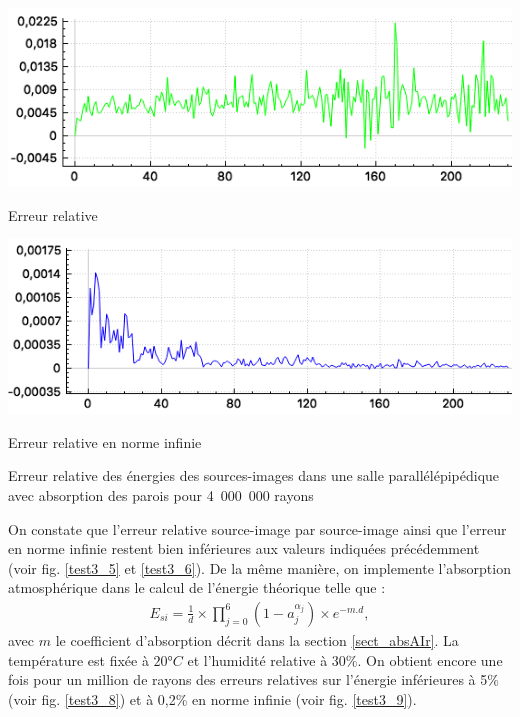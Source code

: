 \begin{figureth}
	\begin{subfigureth}{0.8\textwidth}
		\includegraphics[width=\linewidth]{images/test3_5}
		\caption{Erreur relative}
		\label{test3_5}
	\end{subfigureth}
	\begin{subfigureth}{0.8\textwidth}
		\includegraphics[width=\linewidth]{images/test3_6}
		\caption{Erreur relative en norme infinie}
		\label{test3_6}
	\end{subfigureth}
	\caption{Erreur relative des énergies des sources-images dans une salle parallélépipédique avec absorption des parois pour 4~000~000 rayons}
\end{figureth}


On constate que l'erreur relative source-image par source-image ainsi que l'erreur en norme infinie restent bien inférieures aux valeurs indiquées précédemment (voir fig. \ref{test3_5} et \ref{test3_6}). De la même manière, on implemente l'absorption atmosphérique dans le calcul de l'énergie théorique telle que :
\begin{align}
E_{si} = \frac{1}{d} \times \prod_{j=0}^{6}{(1-a_j^{\alpha_j})} \times e^{-m.d}, 
\end{align}
avec $m$ le coefficient d'absorption décrit dans la section \ref{sect_absAIr}. La température est fixée à $20°C$ et l'humidité relative à $30\%$. On obtient encore une fois pour un million de rayons des erreurs relatives sur l'énergie inférieures à 5\% (voir fig. \ref{test3_8}) et à 0,2\% en norme infinie (voir fig. \ref{test3_9}).


